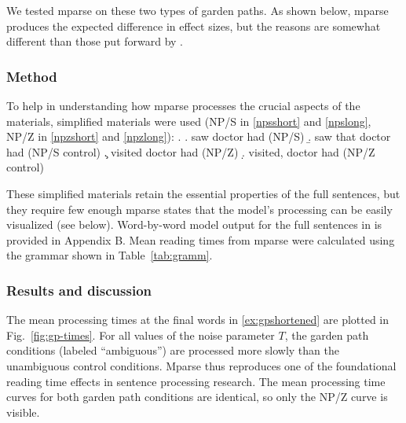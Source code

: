 \documentclass[a4paper, 12pt]{article}
\begin{document}
We tested mparse on these two types of garden paths. As shown below, mparse
produces the expected difference in effect sizes, but the reasons are somewhat different
than those put forward by \citet{sturt1999structural}.

\subsubsection{Method}
To help in understanding how mparse processes the crucial aspects of the
materials, simplified materials were used (NP/S in \ref{npsshort} and
\ref{npslong}, NP/Z in
\ref{npzshort} and \ref{npzlong}): \ex. \label{ex:gpshortened} \a. \label{npsshort} saw doctor
had (NP/S) \b. \label{npslong} saw that doctor had (NP/S control) \c.
\label{npzshort} visited doctor had (NP/Z) \d. \label{npzlong} visited, doctor
had (NP/Z control)

These simplified materials retain the essential properties of the full
sentences, but they require few enough mparse states that the model's
processing can be easily visualized (see below). Word-by-word model output for
the full sentences in \LLast is provided in Appendix B. Mean reading times from
mparse were calculated using the grammar shown in Table~\ref{tab:gramm}. 

\subsubsection{Results and discussion}






The mean processing times at the final words in \ref{ex:gpshortened} are plotted in
Fig.~\ref{fig:gp-times}. For all values of the noise parameter $T$, the garden
path conditions (labeled ``ambiguous'') are processed more slowly than the
unambiguous control conditions. Mparse thus reproduces one of
the foundational reading time effects in sentence processing research. The
mean processing time curves for both garden path conditions are identical, so
only the NP/Z curve is visible.
\end{document}
